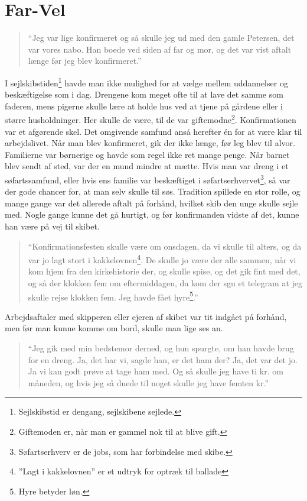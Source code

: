 \chapter{Far-Vel}\label{far-vel}

\begin{quote}
``Jeg var lige konfirmeret og så skulle jeg ud med den gamle Petersen,
det var vores nabo. Han boede ved siden af far og mor, og det var vist
aftalt længe før jeg blev konfirmeret.''
\end{quote}

I sejlskibstiden\footnote{Sejlskibstid er dengang, sejlskibene sejlede.}
havde man ikke mulighed for at vælge mellem uddannelser og beskæftigelse
som i dag. Drengene kom meget ofte til at lave det samme som faderen,
mens pigerne skulle lære at holde hus ved at tjene på gårdene eller i
større husholdninger. Her skulle de være, til de var
giftemodne\footnote{Giftemoden er, når man er gammel nok til at blive
  gift.}. Konfirmationen var et afgørende skel. Det omgivende samfund
anså herefter én for at være klar til arbejdslivet. Når man blev
konfirmeret, gik der ikke længe, før leg blev til alvor. Familierne var
børnerige og havde som regel ikke ret mange penge. Når barnet blev sendt
af sted, var der en mund mindre at mætte. Hvis man var dreng i et
søfartssamfund, eller hvis ens familie var beskæftiget i
søfartserhvervet\footnote{Søfartserhverv er de jobs, som har forbindelse
  med skibe.}, så var der gode chancer for, at man selv skulle til søs.
Tradition spillede en stor rolle, og mange gange var det allerede aftalt
på forhånd, hvilket skib den unge skulle sejle med. Nogle gange kunne
det gå hurtigt, og før konfirmanden vidste af det, kunne han være på vej
til skibet.

\begin{quote}
``Konfirmationsfesten skulle være om onsdagen, da vi skulle til alters,
og da var jo lagt stort i kakkelovnen\footnote{''Lagt i kakkelovnen'' er
  et udtryk for optræk til ballade}. De skulle jo være der alle sammen,
når vi kom hjem fra den kirkehistorie der, og skulle spise, og det gik
fint med det, og så der klokken fem om eftermiddagen, da kom der sgu et
telegram at jeg skulle rejse klokken fem. Jeg havde fået hyre\footnote{Hyre
  betyder løn.}.''
\end{quote}

Arbejdsaftaler med skipperen eller ejeren af skibet var tit indgået på
forhånd, men før man kunne komme om bord, skulle man lige ses an.

\begin{quote}
``Jeg gik med min bedstemor derned, og hun spurgte, om han havde brug
for en dreng. Ja, det har vi, sagde han, er det ham der? Ja, det var det
jo. Ja vi kan godt prøve at tage ham med. Og så skulle jeg have ti kr.
om måneden, og hvis jeg så duede til noget skulle jeg have femten kr.''
\end{quote}

